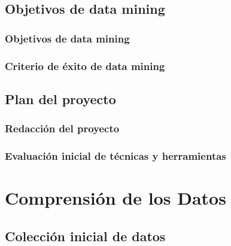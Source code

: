 \documentclass[11pt,a4paper]{tesis}
\begin{document}
\section{Objetivos de data mining}
\subsection{Objetivos de data mining}

\subsection{Criterio de éxito de data mining}

\section{Plan del proyecto}

\subsection{Redacción del proyecto}

\subsection{Evaluación inicial de técnicas y herramientas}


\chapter{Comprensión de los Datos}
\section{Colección inicial de datos}

\end{document}
